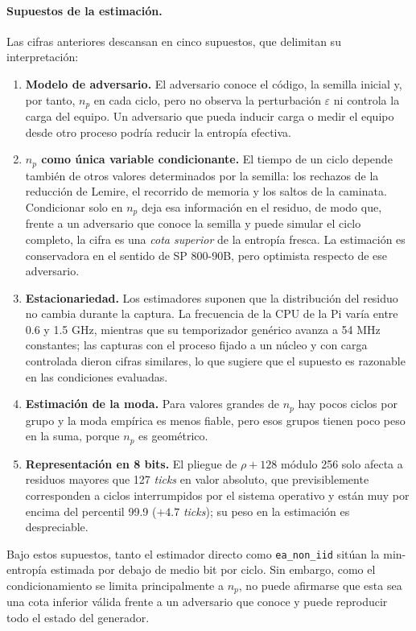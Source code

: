 \paragraph{Supuestos de la estimación.} Las cifras anteriores descansan en cinco supuestos, que delimitan su interpretación:
\begin{enumerate}
    \item \textbf{Modelo de adversario.} El adversario conoce el código, la semilla inicial y, por tanto, $n_p$ en cada ciclo, pero no observa la perturbación $\varepsilon$ ni controla la carga del equipo. Un adversario que pueda inducir carga o medir el equipo desde otro proceso podría reducir la entropía efectiva.
    \item \textbf{$n_p$ como única variable condicionante.} El tiempo de un ciclo depende también de otros valores determinados por la semilla: los rechazos de la reducción de Lemire, el recorrido de memoria y los saltos de la caminata. Condicionar solo en $n_p$ deja esa información en el residuo, de modo que, frente a un adversario que conoce la semilla y puede simular el ciclo completo, la cifra es una \emph{cota superior} de la entropía fresca. La estimación es conservadora en el sentido de SP 800-90B, pero optimista respecto de ese adversario.
    \item \textbf{Estacionariedad.} Los estimadores suponen que la distribución del residuo no cambia durante la captura. La frecuencia de la CPU de la Pi varía entre 0.6 y 1.5 GHz, mientras que su temporizador genérico avanza a 54 MHz constantes; las capturas con el proceso fijado a un núcleo y con carga controlada dieron cifras similares, lo que sugiere que el supuesto es razonable en las condiciones evaluadas.
    \item \textbf{Estimación de la moda.} Para valores grandes de $n_p$ hay pocos ciclos por grupo y la moda empírica es menos fiable, pero esos grupos tienen poco peso en la suma, porque $n_p$ es geométrico.
    \item \textbf{Representación en 8 bits.} El pliegue de $\rho + 128$ módulo 256 solo afecta a residuos mayores que 127 \textit{ticks} en valor absoluto, que previsiblemente corresponden a ciclos interrumpidos por el sistema operativo y están muy por encima del percentil 99.9 ($+4.7$ \textit{ticks}); su peso en la estimación es despreciable.
\end{enumerate}

Bajo estos supuestos, tanto el estimador directo como \texttt{ea\_non\_iid} sitúan la min-entropía estimada por debajo de medio bit por ciclo. Sin embargo, como el condicionamiento se limita principalmente a $n_p$, no puede afirmarse que esta sea una cota inferior válida frente a un adversario que conoce y puede reproducir todo el estado del generador.

